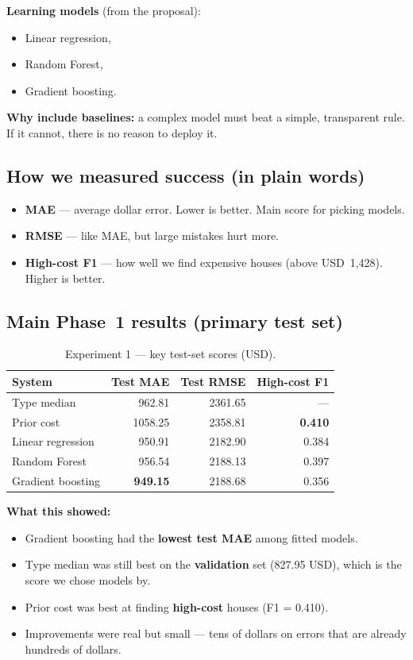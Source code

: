\documentclass[11pt,a4paper]{article}
\begin{document}
\textbf{Learning models} (from the proposal):
\begin{itemize}
  \item Linear regression,
  \item Random Forest,
  \item Gradient boosting.
\end{itemize}

\textbf{Why include baselines:} a complex model must beat a simple, transparent rule. If it cannot, there is no reason to deploy it.

\subsection{How we measured success (in plain words)}

\begin{itemize}
  \item \textbf{MAE} --- average dollar error. Lower is better. Main score for picking models.
  \item \textbf{RMSE} --- like MAE, but large mistakes hurt more.
  \item \textbf{High-cost F1} --- how well we find expensive houses (above USD~1,428). Higher is better.
\end{itemize}

\subsection{Main Phase~1 results (primary test set)}

\begin{table}[ht]
\centering
\caption{Experiment 1 --- key test-set scores (USD).}
\begin{tabular}{@{}lrrr@{}}
\toprule
System & Test MAE & Test RMSE & High-cost F1 \\
\midrule
Type median & 962.81 & 2361.65 & --- \\
Prior cost & 1058.25 & 2358.81 & \textbf{0.410} \\
Linear regression & 950.91 & 2182.90 & 0.384 \\
Random Forest & 956.54 & 2188.13 & 0.397 \\
Gradient boosting & \textbf{949.15} & 2188.68 & 0.356 \\
\bottomrule
\end{tabular}
\end{table}

\textbf{What this showed:}
\begin{itemize}
  \item Gradient boosting had the \textbf{lowest test MAE} among fitted models.
  \item Type median was still best on the \textbf{validation} set (827.95 USD), which is the score we chose models by.
  \item Prior cost was best at finding \textbf{high-cost} houses (F1 = 0.410).
  \item Improvements were real but small --- tens of dollars on errors that are already hundreds of dollars.
\end{itemize}
\end{document}
